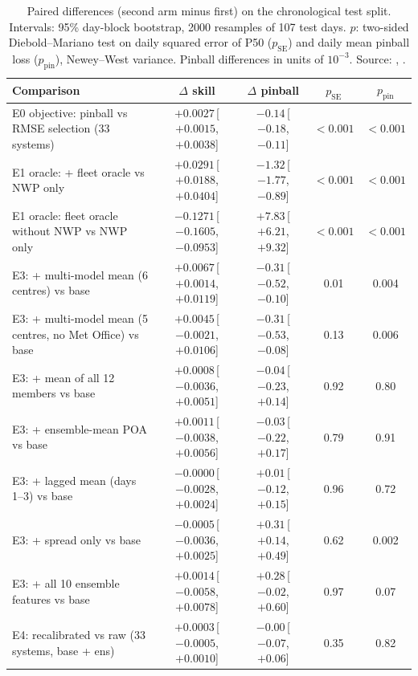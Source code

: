 \begin{table}[H]
\centering
\caption{Paired differences (second arm minus first) on the chronological test split. Intervals: 95\% day-block bootstrap, 2000 resamples of 107 test days. $p$: two-sided Diebold--Mariano test on daily squared error of P50 ($p_\mathrm{SE}$) and daily mean pinball loss ($p_\mathrm{pin}$), Newey--West variance. Pinball differences in units of $10^{-3}$. Source: , .}
\label{tab:s-paired}
\scriptsize
\begin{tabularx}{\textwidth}{@{}X c c c c@{}}
\toprule
Comparison & $\Delta$ skill & $\Delta$ pinball & $p_\mathrm{SE}$ & $p_\mathrm{pin}$ \\
\midrule
E0 objective: pinball vs RMSE selection (33 systems) & $+0.0027$\,[$+0.0015$, $+0.0038$] & $-0.14$\,[$-0.18$, $-0.11$] & $<0.001$ & $<0.001$ \\
E1 oracle: + fleet oracle vs NWP only & $+0.0291$\,[$+0.0188$, $+0.0404$] & $-1.32$\,[$-1.77$, $-0.89$] & $<0.001$ & $<0.001$ \\
E1 oracle: fleet oracle without NWP vs NWP only & $-0.1271$\,[$-0.1605$, $-0.0953$] & $+7.83$\,[$+6.21$, $+9.32$] & $<0.001$ & $<0.001$ \\
E3: + multi-model mean (6 centres) vs base & $+0.0067$\,[$+0.0014$, $+0.0119$] & $-0.31$\,[$-0.52$, $-0.10$] & 0.01 & 0.004 \\
E3: + multi-model mean (5 centres, no Met Office) vs base & $+0.0045$\,[$-0.0021$, $+0.0106$] & $-0.31$\,[$-0.53$, $-0.08$] & 0.13 & 0.006 \\
E3: + mean of all 12 members vs base & $+0.0008$\,[$-0.0036$, $+0.0051$] & $-0.04$\,[$-0.23$, $+0.14$] & 0.92 & 0.80 \\
E3: + ensemble-mean POA vs base & $+0.0011$\,[$-0.0038$, $+0.0056$] & $-0.03$\,[$-0.22$, $+0.17$] & 0.79 & 0.91 \\
E3: + lagged mean (days 1--3) vs base & $-0.0000$\,[$-0.0028$, $+0.0024$] & $+0.01$\,[$-0.12$, $+0.15$] & 0.96 & 0.72 \\
E3: + spread only vs base & $-0.0005$\,[$-0.0036$, $+0.0025$] & $+0.31$\,[$+0.14$, $+0.49$] & 0.62 & 0.002 \\
E3: + all 10 ensemble features vs base & $+0.0014$\,[$-0.0058$, $+0.0078$] & $+0.28$\,[$-0.02$, $+0.60$] & 0.97 & 0.07 \\
E4: recalibrated vs raw (33 systems, base + ens) & $+0.0003$\,[$-0.0005$, $+0.0010$] & $-0.00$\,[$-0.07$, $+0.06$] & 0.35 & 0.82 \\

\end{tabularx}
\end{table}
